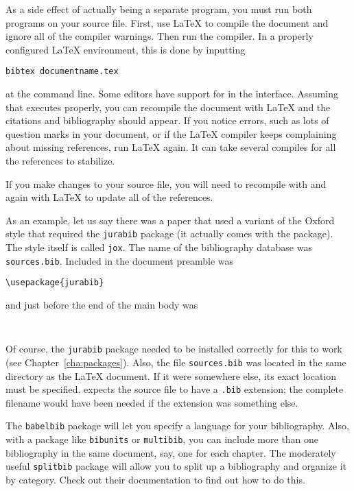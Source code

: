 As a side effect of \BibTeX{} actually being a separate program, you
must run both programs on your source file.  First, use \LaTeX{} to
compile the document and ignore all of the compiler warnings.  Then
run the \BibTeX{} compiler.  In a properly configured \LaTeX{}
environment, this is done by inputting
\begin{verbatim}
bibtex documentname.tex
\end{verbatim}
at the command line.  Some editors have support for \BibTeX{} in the
interface.  Assuming that \BibTeX{} executes properly, you can
recompile the document with \LaTeX{} and the citations and
bibliography should appear.  If you notice errors, such as lots of
question marks in your document, or if the \LaTeX{} compiler keeps
complaining about missing references, run \LaTeX{} again.  It can take
several compiles for all the references to stabilize.

If you make changes to your source file, you will need to recompile
with \BibTeX{} and again with \LaTeX{} to update all of the
references.

As an example, let us say there was a paper that used a variant of the
Oxford style that required the \texttt{jurabib} package (it actually
comes with the package).  The style itself is called \texttt{jox}.
The name of the bibliography database was \texttt{sources.bib}.
Included in the document preamble was
\begin{verbatim}
\usepackage{jurabib}
\end{verbatim}
and just before the end of the main body was
\begin{verbatim}


\end{verbatim}
Of course, the \texttt{jurabib} package needed to be installed
correctly for this to work (see Chapter~\ref{cha:packages}).  Also,
the file \texttt{sources.bib} was located in the same directory as the
\LaTeX{} document.  If it were somewhere else, its exact location must
be specified.  \BibTeX{} expects the source file to have a
\texttt{.bib} extension; the complete filename would have been needed
if the extension was something else.

The \texttt{babelbib} package will let you specify a language for your
bibliography.  Also, with a package like \texttt{bibunits} or
\texttt{multibib}, you can include more than one bibliography in the
same document, say, one for each chapter.  The moderately useful
\texttt{splitbib} package will allow you to split up a bibliography
and organize it by category.  Check out their documentation to find
out how to do this.

